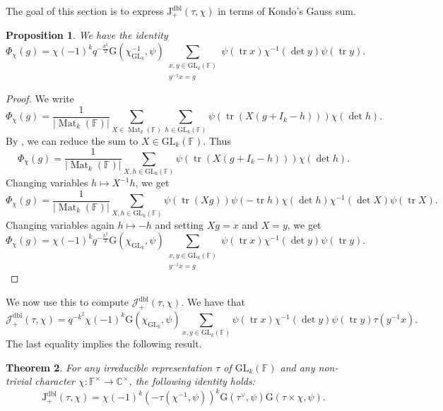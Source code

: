 \documentclass[12pt, reqno]{amsart}
\newtheorem{theorem}{Theorem}[section]
\newtheorem{proposition}[theorem]{Proposition}
\theoremstyle{definition}
\theoremstyle{definition}
\theoremstyle{definition}
\newcommand{\cComplex}{\mathbb{C}}
\newcommand{\multiplicativegroup}[1]{#1^{\times}}
\newcommand{\sizeof}[1]{\left|#1\right|}
\newcommand{\fieldCharacter}{\psi}
\newcommand{\IdentityMatrix}[1]{I_{#1}}
\newcommand{\trace}{\operatorname{tr}}
\newcommand{\GL}{\mathrm{GL}}
\newcommand{\finiteField}{\mathbb{F}}
\newcommand{\squareMatrix}{\operatorname{Mat}}
\newcommand{\GaussSumSingleCharacter}[2]{\tau\left(#1, #2\right)}
\newcommand{\posDblJacobiSum}[2]{\mathcal{J}_{+}^{\mathrm{dbl}}\left(#1, #2\right)}
\newcommand{\GaussSumScalar}[2]{\mathrm{G}\left(#1, #2\right)}
\newcommand{\posDblJacobiSumScalar}[2]{\mathrm{J}_{+}^{\mathrm{dbl}}\left(#1, #2\right)}
\begin{document}
The goal of this section is to express $\posDblJacobiSumScalar{\tau}{\chi}$ in terms of Kondo's Gauss sum.

\begin{proposition}\label{prop:doubling-for-gln-in-terms-of-kondo}
	We have the identity
	$$\Phi_{\chi}\left(g\right) = \chi\left(-1\right)^k q^{-\frac{k^2}{2}} \GaussSumScalar{\chi^{-1}_{\GL_k}}{\fieldCharacter} \sum_{\substack{x, y \in \GL_k\left(\finiteField\right)\\
			y^{-1} x = g}} \fieldCharacter\left(\trace x\right) \chi^{-1}\left(\det y\right) \fieldCharacter\left(\trace y\right).$$
\end{proposition}
\begin{proof}
	We write $$\Phi_{\chi}\left(g\right) = \frac{1}{\sizeof{\squareMatrix_k\left(\finiteField\right)}}\sum_{X \in \squareMatrix_k\left(\finiteField\right)} \sum_{h \in \GL_k\left(\finiteField\right)} \fieldCharacter\left(\trace \left(X\left(g+\IdentityMatrix{k}-h\right)\right)\right) \chi\left(\det h\right).$$
	By , we can reduce the sum to $X \in \GL_k\left(\finiteField\right)$. Thus	$$\Phi_{\chi}\left(g\right) = \frac{1}{\sizeof{\squareMatrix_k\left(\finiteField\right)}} \sum_{X, h \in \GL_k\left(\finiteField\right)} \fieldCharacter\left(\trace \left(X\left(g+\IdentityMatrix{k}-h\right)\right)\right) \chi\left(\det h\right).$$
	Changing variables $h \mapsto X^{-1} h$, we get
	$$\Phi_{\chi}\left(g\right) = \frac{1}{\sizeof{\squareMatrix_k\left(\finiteField\right)}} \sum_{X, h \in \GL_k\left(\finiteField\right)} \fieldCharacter\left(\trace \left(Xg\right)\right) \fieldCharacter\left(-\trace h\right) \chi\left(\det h\right) \chi^{-1}\left(\det X\right) \fieldCharacter\left(\trace X\right).$$
	Changing variables again $h \mapsto -h$ and setting $Xg = x$ and $X = y$, we get  
	$$\Phi_{\chi}\left(g\right) = \chi\left(-1\right)^k q^{-\frac{k^2}{2}} \GaussSumScalar{\chi_{\GL_k}}{\fieldCharacter} \sum_{\substack{x, y \in \GL_k\left(\finiteField\right)\\
			y^{-1} x = g}} \fieldCharacter\left(\trace x\right) \chi^{-1}\left(\det y\right) \fieldCharacter\left(\trace y\right).$$
\end{proof}

We now use this to compute $\posDblJacobiSum{\tau}{\chi}$. We have that $$\posDblJacobiSum{\tau}{\chi} = q^{-k^2} \chi\left(-1\right)^k \GaussSumScalar{\chi_{\GL_k}}{\fieldCharacter} \sum_{x, y \in \GL_k\left(\finiteField\right)} \fieldCharacter\left(\trace x\right) \chi^{-1}\left(\det y\right) \fieldCharacter\left(\trace y\right) \tau\left(y^{-1} x\right).$$
The last equality implies the following result.
\begin{theorem}\label{thm:gln-doubling-gauss-sum-in-terms-of-kondo}For any irreducible representation $\tau$ of $\GL_k\left(\finiteField\right)$ and any non-trivial character $\chi \colon \multiplicativegroup{\finiteField} \to \multiplicativegroup{\cComplex}$, the following identity holds:
	$$\posDblJacobiSumScalar{\tau}{\chi} = \chi\left(-1\right)^k \left(-\GaussSumSingleCharacter{\chi^{-1}}{\fieldCharacter}\right)^k \GaussSumScalar{\tau^{\vee}}{\fieldCharacter} \GaussSumScalar{\tau \times \chi}{\fieldCharacter}.$$
\end{theorem}
\end{document}
